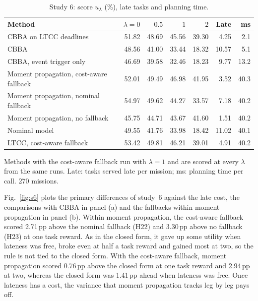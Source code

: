 \documentclass[a4paper,fleqn]{cas-dc}
\newcommand{\mname}{LTCC}  %
\newcommand{\uprighttext}{\def\textbf##1{##1}\def\textit##1{##1}}
\newcounter{prop}
\begin{document}
\begingroup\uprighttext
\begin{table}[t]
\caption{Study 6: score $u_\lambda$ (\%), late tasks and planning time.}\label{tab:s6}
\centering\small
\begin{threeparttable}
\begin{tabular}{lrrrrrr}
\toprule
Method & $\lambda=0$ & $0.5$ & $1$ & $2$ & Late & ms \\
\midrule
CBBA on \mname{} deadlines & 51.82 & 48.69 & 45.56 & 39.30 & 4.25 & 2.1 \\
CBBA & 48.56 & 41.00 & 33.44 & 18.32 & 10.57 & 5.1 \\
CBBA, event trigger only & 46.69 & 39.58 & 32.46 & 18.23 & 9.77 & 13.2 \\
Moment propagation, cost-aware fallback & 52.01 & 49.49 & 46.98 & 41.95 & 3.52 & 40.3 \\
Moment propagation, nominal fallback & 54.97 & 49.62 & 44.27 & 33.57 & 7.18 & 40.2 \\
Moment propagation, no fallback & 45.75 & 44.71 & 43.67 & 41.60 & 1.51 & 40.2 \\
Nominal model & 49.55 & 41.76 & 33.98 & 18.42 & 11.02 & 40.1 \\
\mname{}, cost-aware fallback & 53.42 & 49.81 & 46.21 & 39.01 & 4.91 & 40.2 \\
\bottomrule
\end{tabular}
\begin{tablenotes}[flushleft]\scriptsize
\item[] Methods with the cost-aware fallback run with $\lambda=1$ and are scored at every $\lambda$ from the same runs. Late: tasks served late per mission; ms: planning time per call. 270 missions.
\end{tablenotes}
\end{threeparttable}
\end{table}
\endgroup

Fig.~\ref{fig:s6} plots the primary differences of study~6 against the late cost, the comparisons with CBBA in panel
(a) and the fallbacks within moment propagation in panel (b). Within moment propagation, the
cost-aware fallback scored 2.71\,pp above the nominal fallback (H22) and 3.30\,pp above
no fallback (H23) at one task reward. As in the closed form, it gave up some utility when lateness was free, broke even
at half a task reward and gained most at two, so the rule is not tied to the closed form. With the cost-aware fallback,
moment propagation scored 0.76\,pp above the closed form at one task reward and
2.94\,pp at two, whereas the closed form was 1.41\,pp ahead when lateness was free.
Once lateness has a cost, the variance that moment propagation tracks leg by leg pays off.
\end{document}
